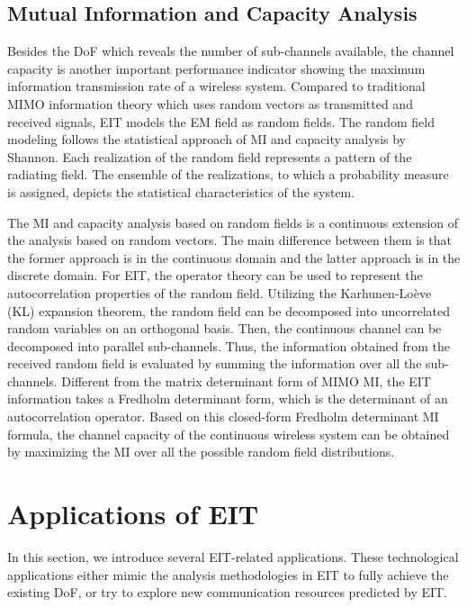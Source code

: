\documentclass[journal,twocolumn]{IEEEtran}
\begin{document}
\subsection{Mutual Information and Capacity Analysis}
Besides the DoF which reveals the number of sub-channels available, the channel capacity is another important performance indicator showing the maximum information transmission rate of a wireless system. Compared to traditional MIMO information theory which uses random vectors as transmitted and received signals, EIT models the EM field as random fields. The random field modeling follows the statistical approach of MI and capacity analysis by Shannon. Each realization of the random field represents a pattern of the radiating field. The ensemble of the realizations, to which a probability measure is assigned, depicts the statistical characteristics of the system. 

The MI and capacity analysis based on random fields is a continuous extension of the analysis based on random vectors. The main difference between them is that the former approach is in the continuous domain and the latter approach is in the discrete domain. For EIT, the operator theory can be used to represent the autocorrelation properties of the random field. 
Utilizing the Karhunen-Lo\`{e}ve (KL) expansion theorem, the random field can be decomposed into uncorrelated random variables on an orthogonal basis. Then, the continuous channel can be decomposed into parallel sub-channels. Thus, the information obtained from the received random field is evaluated by summing the information over all the sub-channels. 
Different from the matrix determinant form of MIMO MI, the EIT information takes a Fredholm determinant form, which is the determinant of an autocorrelation operator. Based on this closed-form Fredholm determinant MI formula, the channel capacity of the continuous wireless system can be obtained by maximizing the MI over all the possible random field distributions. 


\section{Applications of EIT}
In this section, we introduce several EIT-related applications. 
These technological applications either mimic the analysis methodologies in EIT to fully achieve the existing DoF, or try to explore new communication resources predicted by EIT. 
\end{document}

